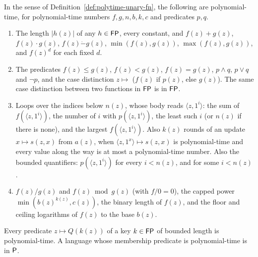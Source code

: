 \begin{lemma}
  \label{lem:polytime-unary-closure}
  \leanok
  In the sense of Definition~\ref{def:polytime-unary-fn}, the following are
  polynomial-time, for polynomial-time numbers $f, g, n, b, k, c$ and
  predicates $p, q$.
  \begin{enumerate}
    \item The length $|h(z)|$ of any $h \in \mathsf{FP}$, every constant, and
      $f(z) + g(z)$, $f(z) \cdot g(z)$, $f(z) \mathbin{\dot-} g(z)$,
      $\min(f(z), g(z))$, $\max(f(z), g(z))$, and $f(z)^d$ for each fixed $d$.
    \item The predicates $f(z) \le g(z)$, $f(z) < g(z)$, $f(z) = g(z)$,
      $p \wedge q$, $p \vee q$ and $\neg p$, and the case distinction
      $z \mapsto$ ($f(z)$ if $p(z)$, else $g(z)$). The same case distinction
      between two functions in $\mathsf{FP}$ is in $\mathsf{FP}$.
    \item Loops over the indices below $n(z)$, whose body reads
      $\langle z, 1^i \rangle$: the sum of $f(\langle z, 1^i \rangle)$, the
      number of $i$ with $p(\langle z, 1^i \rangle)$, the least such $i$ (or
      $n(z)$ if there is none), and the largest $f(\langle z, 1^i \rangle)$.
      Also $k(z)$ rounds of an update $x \mapsto s(z, x)$ from $a(z)$, when
      $\langle z, 1^x \rangle \mapsto s(z, x)$ is polynomial-time and every
      value along the way is at most a polynomial-time number. Also the
      bounded quantifiers: $p(\langle z, 1^i \rangle)$ for every $i < n(z)$,
      and for some $i < n(z)$.
    \item $f(z) / g(z)$ and $f(z) \bmod g(z)$ (with $f / 0 = 0$), the capped
      power $\min(b(z)^{k(z)}, c(z))$, the binary length of $f(z)$, and the
      floor and ceiling logarithms of $f(z)$ to the base $b(z)$.
  \end{enumerate}
  Every predicate $z \mapsto Q(k(z))$ of a key $k \in \mathsf{FP}$ of bounded
  length is polynomial-time. A language whose membership predicate is
  polynomial-time is in $\mathsf{P}$.
\end{lemma}

